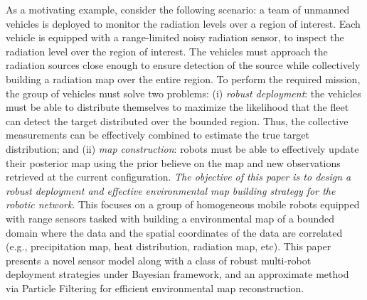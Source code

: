 \documentclass[letterpaper, 10 pt, conference]{ieeeconf}
\newcommand{\Ram}[1]{{\normalsize{\textbf{({\color{green}Ram:\ }#1)}}}}
\begin{document}
As a motivating example, consider the following scenario: a team of unmanned vehicles is deployed to monitor the radiation levels over a region of interest. 
Each vehicle is equipped with a range-limited noisy radiation sensor, to inspect the radiation level over the region of interest. 
The vehicles must approach the radiation sources close enough to ensure detection of the source while collectively building a radiation map over the entire region.
To perform the required mission, the group of vehicles must solve two problems: (i) \emph{robust deployment}: the vehicles must be able to distribute themselves to maximize the likelihood that the fleet can detect the target distributed over the bounded region. Thus, the collective measurements can be effectively combined to estimate the true target distribution; and (ii) \emph{map construction}: robots must be able to effectively update their posterior map using the prior believe on the map and new observations retrieved at the current configuration. 
\emph{The objective of this paper is to design a robust deployment and effective environmental map building strategy for the robotic network}.
This focuses on a group of homogeneous mobile robots equipped with range sensors tasked with building a environmental map of a bounded domain where the data and the spatial coordinates of the data are correlated (e.g., precipitation map, heat distribution, radiation map, etc).
This paper presents a novel sensor model along with a class of robust multi-robot deployment strategies under Bayesian framework, and an approximate method via Particle Filtering for efficient environmental map reconstruction.


\end{document}
